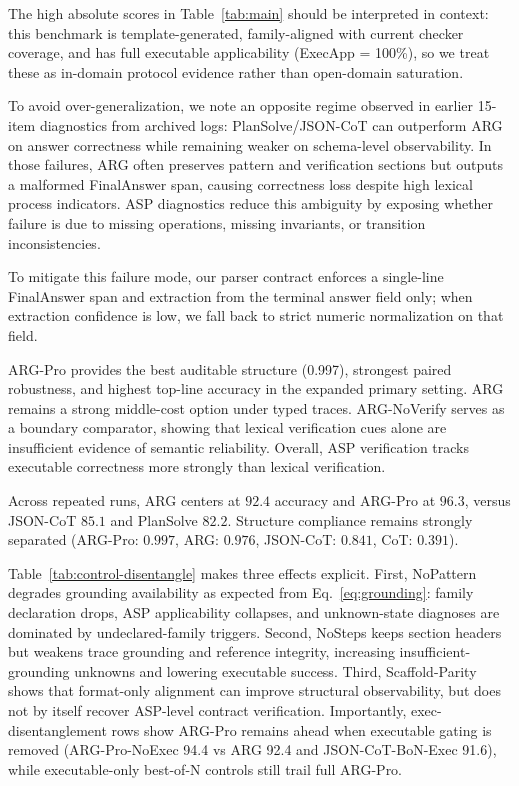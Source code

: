 \documentclass{article}
\begin{document}
The high absolute scores in Table~\ref{tab:main} should be interpreted in context: this benchmark is template-generated, family-aligned with current checker coverage, and has full executable applicability (ExecApp = 100\%), so we treat these as in-domain protocol evidence rather than open-domain saturation.

To avoid over-generalization, we note an opposite regime observed in earlier 15-item diagnostics from archived logs: PlanSolve/JSON-CoT can outperform ARG on answer correctness while remaining weaker on schema-level observability. In those failures, ARG often preserves pattern and verification sections but outputs a malformed FinalAnswer span, causing correctness loss despite high lexical process indicators. ASP diagnostics reduce this ambiguity by exposing whether failure is due to missing operations, missing invariants, or transition inconsistencies.

To mitigate this failure mode, our parser contract enforces a single-line FinalAnswer span and extraction from the terminal answer field only; when extraction confidence is low, we fall back to strict numeric normalization on that field.

ARG-Pro provides the best auditable structure (0.997), strongest paired robustness, and highest top-line accuracy in the expanded primary setting. ARG remains a strong middle-cost option under typed traces. ARG-NoVerify serves as a boundary comparator, showing that lexical verification cues alone are insufficient evidence of semantic reliability. Overall, ASP verification tracks executable correctness more strongly than lexical verification.

Across repeated runs, ARG centers at \(92.4\) accuracy and ARG-Pro at \(96.3\), versus JSON-CoT \(85.1\) and PlanSolve \(82.2\). Structure compliance remains strongly separated (ARG-Pro: \(0.997\), ARG: \(0.976\), JSON-CoT: \(0.841\), CoT: \(0.391\)).

Table~\ref{tab:control-disentangle} makes three effects explicit. First, NoPattern degrades grounding availability as expected from Eq.~\eqref{eq:grounding}: family declaration drops, ASP applicability collapses, and unknown-state diagnoses are dominated by undeclared-family triggers. Second, NoSteps keeps section headers but weakens trace grounding and reference integrity, increasing insufficient-grounding unknowns and lowering executable success. Third, Scaffold-Parity shows that format-only alignment can improve structural observability, but does not by itself recover ASP-level contract verification. Importantly, exec-disentanglement rows show ARG-Pro remains ahead when executable gating is removed (ARG-Pro-NoExec 94.4 vs ARG 92.4 and JSON-CoT-BoN-Exec 91.6), while executable-only best-of-N controls still trail full ARG-Pro.
\end{document}
